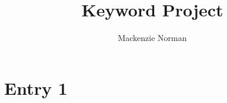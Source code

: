 \documentclass[12pt]{report}
\title{
Keyword Project
}
\author{Mackenzie Norman}
\date{}
\begin{document}
\maketitle


\chapter{Entry 1}

\end{document}
